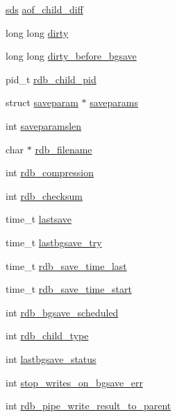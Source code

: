 \begin{DoxyCompactItemize}
\hyperlink{sds_8h_ad69abac3df4532879db9642c95f5ef6f}{sds} \hyperlink{structredis_server_a271e57a2ee7bec8acce8060704c268e3}{aof\+\_\+child\+\_\+diff}
\item 
long long \hyperlink{structredis_server_a7d1f8a07982c1093e48e8dcb120fcf2f}{dirty}
\item 
long long \hyperlink{structredis_server_a82e4e7fd01817a9ae3acae8de8aac8ba}{dirty\+\_\+before\+\_\+bgsave}
\item 
pid\+\_\+t \hyperlink{structredis_server_ad3d5e16b8c8e1f62d71cf49c41c89b9d}{rdb\+\_\+child\+\_\+pid}
\item 
struct \hyperlink{structsaveparam}{saveparam} $\ast$ \hyperlink{structredis_server_a2ef075c5a1090a6b39536909cd779787}{saveparams}
\item 
int \hyperlink{structredis_server_ad4654cdc5b77789a9175000290abc831}{saveparamslen}
\item 
char $\ast$ \hyperlink{structredis_server_a062a156ed7bfa9a38ac03d6b28d7732a}{rdb\+\_\+filename}
\item 
int \hyperlink{structredis_server_a672826c5f111e440081c74f2f07180d6}{rdb\+\_\+compression}
\item 
int \hyperlink{structredis_server_a3a842ed365a5fb2b92ea473ce9aa13f2}{rdb\+\_\+checksum}
\item 
time\+\_\+t \hyperlink{structredis_server_ae08caa5f869e19e94cd95d1a2edea4b2}{lastsave}
\item 
time\+\_\+t \hyperlink{structredis_server_ab23a754e7d3bd832810530b360eabd91}{lastbgsave\+\_\+try}
\item 
time\+\_\+t \hyperlink{structredis_server_ae6262935d09c243040d0a767dc4781d9}{rdb\+\_\+save\+\_\+time\+\_\+last}
\item 
time\+\_\+t \hyperlink{structredis_server_a94be71fb61af4310e0bef804992da1ed}{rdb\+\_\+save\+\_\+time\+\_\+start}
\item 
int \hyperlink{structredis_server_a15ca1e9689b70a0f66fe2ccc7ae435cb}{rdb\+\_\+bgsave\+\_\+scheduled}
\item 
int \hyperlink{structredis_server_ad3a0208c5b729ff578851041f2e01441}{rdb\+\_\+child\+\_\+type}
\item 
int \hyperlink{structredis_server_a3171edf0e16ac5d2f1284e46c20762a3}{lastbgsave\+\_\+status}
\item 
int \hyperlink{structredis_server_a74b48fc7843d6cfaf61b0e49a47e2be1}{stop\+\_\+writes\+\_\+on\+\_\+bgsave\+\_\+err}
\item 
int \hyperlink{structredis_server_a163087bdcef645bff76259ff3c46bf83}{rdb\+\_\+pipe\+\_\+write\+\_\+result\+\_\+to\+\_\+parent}

\end{DoxyCompactItemize}
